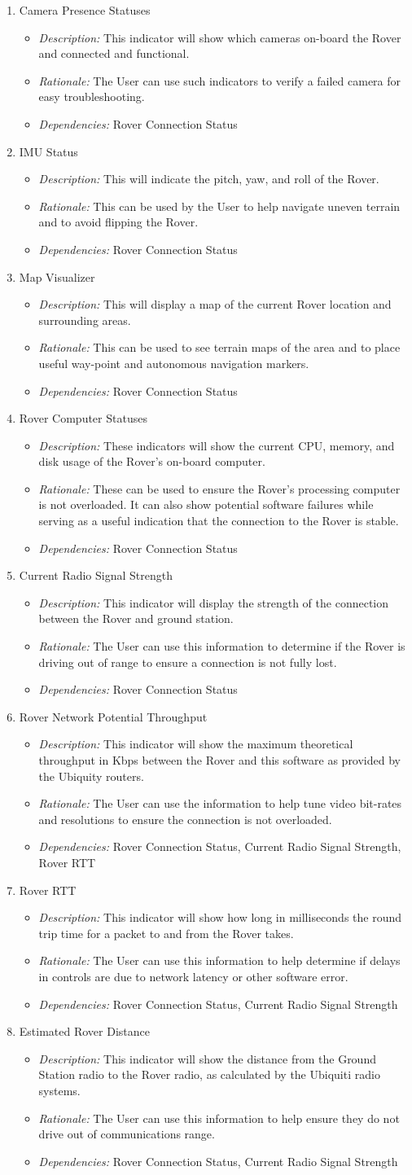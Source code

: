 \documentclass[onecolumn, draftclsnofoot, 10pt, compsoc]{IEEEtran}
\newcommand{\functRequ}[4]{
\item #1%
\par
\begin{itemize}
\item \textit{Description:} #2.%
\item \textit{Rationale:} #3.%
\item \textit{Dependencies:} #4%
\end{itemize}
}
\begin{document}
\begin{enumerate}
\functRequ{Camera Presence Statuses}
{This indicator will show which cameras on-board the Rover and connected and functional}
{The User can use such indicators to verify a failed camera for easy troubleshooting}
{Rover Connection Status}

\functRequ{IMU Status}
{This will indicate the pitch, yaw, and roll of the Rover}
{This can be used by the User to help navigate uneven terrain and to avoid flipping the Rover}
{Rover Connection Status}

\functRequ{Map Visualizer}
{This will display a map of  the current Rover location and surrounding areas}
{This can be used to see terrain maps of the area and to place useful way-point and autonomous navigation markers}
{Rover Connection Status}

\functRequ{Rover Computer Statuses}
{These indicators will show the current CPU, memory, and disk usage of the Rover's on-board computer}
{These can be used to ensure the Rover's processing computer is not overloaded.
It can also show potential software failures while serving as a useful indication that the connection to the Rover is stable}
{Rover Connection Status}

\functRequ{Current Radio Signal Strength}
{This indicator will display the strength of the connection between the Rover and ground station}
{The User can use this information to determine if the Rover is driving out of range to ensure a connection is not fully lost}
{Rover Connection Status}
  
\functRequ{Rover Network Potential Throughput}
{This indicator will show the maximum theoretical throughput in Kbps between the Rover and this software as provided by the Ubiquity routers}
{The User can use the information to help tune video bit-rates and resolutions to ensure the connection is not overloaded}
{Rover Connection Status, Current Radio Signal Strength, Rover RTT}

\functRequ{Rover RTT}
{This indicator will show how long in milliseconds the round trip time for a packet to and from the Rover takes}
{The User can use this information to help determine if delays in controls are due to network latency or other software error}
{Rover Connection Status, Current Radio Signal Strength}

\functRequ{Estimated Rover Distance}
{This indicator will show the distance from the Ground Station radio to the Rover radio, as calculated by the Ubiquiti radio systems}
{The User can use this information to help ensure they do not drive out of communications range}
{Rover Connection Status, Current Radio Signal Strength}


\end{enumerate}
\end{document}
